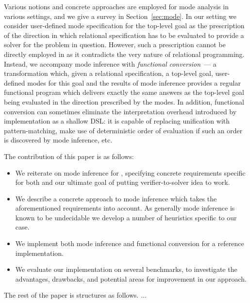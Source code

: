 Various notions and concrete approaches are employed for mode analysis in various settings, and we give a survey in Section~\ref{sec:mode}.
In our setting we consider user-defined mode specification for the top-level goal as the prescription of the direction in which relational specification has to be evaluated to provide a solver for the problem in question.
However, such a prescription cannot be directly employed in \mk as it contradicts the very nature of relational programming.
Instead, we accompany mode inference with \emph{functional conversion}~--- a transformation which, given a relational specification, a top-level goal, user-defined modes for this goal and the results of mode inference provides a regular functional program which delivers exactly the same answers as the top-level goal being evaluated in the direction prescribed by the modes.
In addition, functional conversion can sometimes eliminate the interpretation overhead introduced by \mk implementation as a shallow DSL: it is capable of replacing unification with pattern-matching, make use of deterministic order of evaluation if such an order is discovered by mode inference, etc.

The contribution of this paper is as follows:

\begin{itemize}
\item We reiterate on mode inference for \mk, specifying concrete requirements specific for both \mk and our ultimate goal of putting verifier-to-solver idea to work.
\item We describe a concrete approach to mode inference which takes the aforementioned requirements into account. As generally mode inference is known to be undecidable we   develop a number of heuristics specific to our case.
\item We implement both mode inference and functional conversion for a reference \mk implementation.
\item We evaluate our implementation on several benchmarks, to investigate the advantages, drawbacks, and potential areas for improvement in our approach.
\end{itemize}

The rest of the paper is structures as follows. ...




